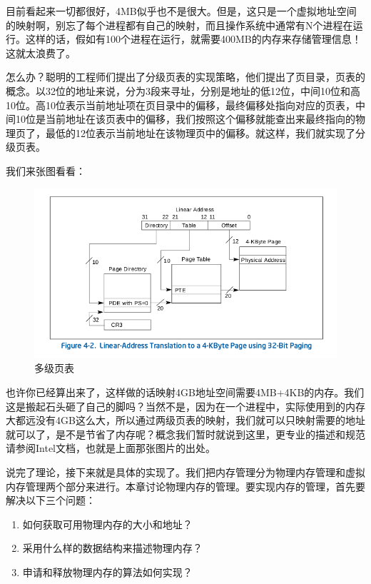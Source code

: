 \par 目前看起来一切都很好，4MB似乎也不是很大。但是，这只是一个虚拟地址空间的映射啊，别忘了每个进程都有自己的映射，而且操作系统中通常有N个进程在运行。这样的话，假如有100个进程在运行，就需要400MB的内存来存储管理信息！这就太浪费了。

\par 怎么办？聪明的工程师们提出了分级页表的实现策略，他们提出了页目录，页表的概念。以32位的地址来说，分为3段来寻址，分别是地址的低12位，中间10位和高10位。高10位表示当前地址项在页目录中的偏移，最终偏移处指向对应的页表，中间10位是当前地址在该页表中的偏移，我们按照这个偏移就能查出来最终指向的物理页了，最低的12位表示当前地址在该物理页中的偏移。就这样，我们就实现了分级页表。

\par 我们来张图看看：

\begin{figure}[ht]
      \centering
      \includegraphics[scale=0.5]{picture/chapt9/PAGE.png}
      \caption{多级页表}
\end{figure}

\par 也许你已经算出来了，这样做的话映射4GB地址空间需要4MB+4KB的内存。我们这是搬起石头砸了自己的脚吗？当然不是，因为在一个进程中，实际使用到的内存大都远没有4GB这么大，所以通过两级页表的映射，我们就可以只映射需要的地址就可以了，是不是节省了内存呢？概念我们暂时就说到这里，更专业的描述和规范请参阅Intel文档，也就是上面那张图片的出处。

\par 说完了理论，接下来就是具体的实现了。我们把内存管理分为物理内存管理和虚拟内存管理两个部分来进行。本章讨论物理内存的管理。要实现内存的管理，首先要解决以下三个问题：

\begin{mdframed}
	\begin{enumerate}
		\item 如何获取可用物理内存的大小和地址？
		\item 采用什么样的数据结构来描述物理内存？
		\item 申请和释放物理内存的算法如何实现？
	\end{enumerate}
\end{mdframed}

